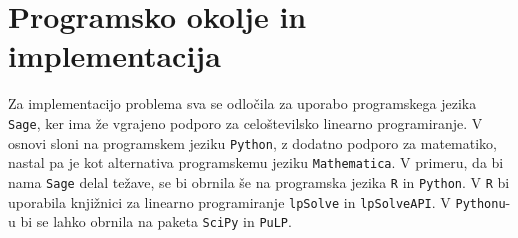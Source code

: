 \documentclass[11pt]{article}
\theoremstyle{definition}
\newcommand{\1}{\mathbbm{1}}
\begin{document}
\section{Programsko okolje in implementacija}
\vspace{0.5cm}

Za implementacijo problema sva se odločila za uporabo programskega jezika \texttt{Sage}, ker ima že vgrajeno podporo za celoštevilsko linearno programiranje. V osnovi sloni na programskem jeziku \texttt{Python}, z dodatno podporo za matematiko, nastal pa je kot alternativa programskemu jeziku \texttt{Mathematica}. V primeru, da bi nama \texttt{Sage} delal težave, se bi obrnila še na programska jezika \texttt{R} in \texttt{Python}. V \texttt{R} bi uporabila knjižnici za linearno programiranje \texttt{lpSolve} in \texttt{lpSolveAPI}. V \texttt{Pythonu}-u bi se lahko obrnila na paketa \texttt{SciPy} in \texttt{PuLP}.
\end{document}
